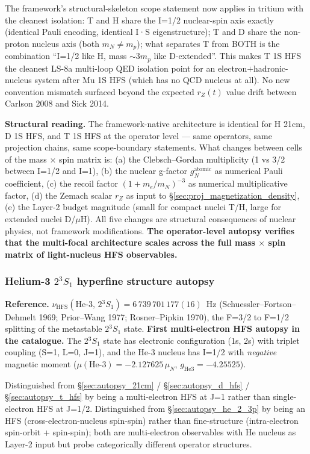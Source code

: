 \documentclass[11pt]{article}
\begin{document}
The framework's structural-skeleton scope statement now applies in
tritium with the cleanest isolation: T and H share the I=1/2
nuclear-spin axis exactly (identical Pauli encoding, identical I·S
eigenstructure); T and D share the non-proton nucleus axis (both
$m_N \neq m_p$); what separates T from BOTH is the combination
``I=1/2 like H, mass $\sim 3 m_p$ like D-extended''.  This makes T
1S HFS the cleanest LS-8a multi-loop QED isolation point for an
electron$+$hadronic-nucleus system after Mu 1S HFS (which has no QCD
nucleus at all).  No new convention mismatch surfaced beyond the
expected $r_Z(t)$ value drift between Carlson 2008 and Sick 2014.

\textbf{Structural reading.}  The framework-native architecture is
identical for H 21cm, D 1S HFS, and T 1S HFS at the operator level
--- same operators, same projection chains, same scope-boundary
statements.  What changes between cells of the mass $\times$ spin
matrix is:
(a) the Clebsch--Gordan multiplicity (1 vs 3/2 between I=1/2 and I=1),
(b) the nuclear g-factor $g_N^\text{atomic}$ as numerical Pauli
coefficient,
(c) the recoil factor $(1+m_e/m_N)^{-3}$ as numerical multiplicative
factor,
(d) the Zemach scalar $r_Z$ as input to \S\ref{sec:proj_magnetization_density},
(e) the Layer-2 budget magnitude (small for compact nuclei T/H,
large for extended nuclei D/$\mu$H).  All five changes are structural
consequences of nuclear physics, not framework modifications.
\textbf{The operator-level autopsy verifies that the multi-focal
architecture scales across the full mass $\times$ spin matrix of
light-nucleus HFS observables.}

\subsubsection{Helium-3 $2{}^3\!S_1$ hyperfine structure autopsy}
\label{sec:autopsy_he3_hfs}

\textbf{Reference.} $\nu_\text{HFS}(\text{He-3},\,2{}^3\!S_1) =
6\,739\,701\,177(16)$~Hz (Schuessler--Fortson--Dehmelt 1969;
Prior--Wang 1977; Rosner--Pipkin 1970), the F=3/2 to F=1/2 splitting
of the metastable $2{}^3\!S_1$ state. \textbf{First multi-electron HFS
autopsy in the catalogue.} The 2$^3\!S_1$ state has electronic
configuration (1s, 2s) with triplet coupling (S=1, L=0, J=1), and the
He-3 nucleus has I=1/2 with \emph{negative} magnetic moment
($\mu(\text{He-3}) = -2.127625\,\mu_N$, $g_\text{He3} = -4.25525$).

Distinguished from \S\ref{sec:autopsy_21cm} / \S\ref{sec:autopsy_d_hfs}
/ \S\ref{sec:autopsy_t_hfs} by being a multi-electron HFS at J=1 rather
than single-electron HFS at J=1/2.  Distinguished from
\S\ref{sec:autopsy_he_2_3p} by being an HFS (cross-electron-nucleus
spin-spin) rather than fine-structure (intra-electron spin-orbit +
spin-spin); both are multi-electron observables with He nucleus as
Layer-2 input but probe categorically different operator structures.
\end{document}
